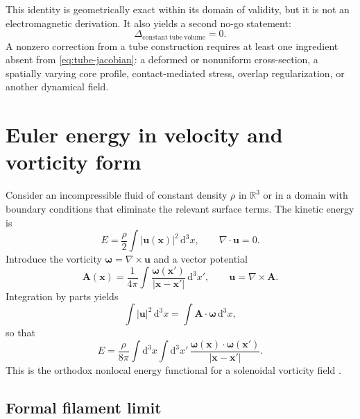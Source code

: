\documentclass[aps,pre,preprint,notitlepage,nofootinbib,superscriptaddress]{revtex4-2}
\newcommand{\dd}{\mathrm d}
\newcommand{\RR}{\mathbb R}
\begin{document}
This identity is geometrically exact within its domain of validity, but it is not an electromagnetic derivation.  It also yields a second no-go statement:
\begin{equation}
  \boxed{\Delta_{\mathrm{constant\ tube\ volume}}=0.}
  \label{eq:tube-no-go}
\end{equation}
A nonzero correction from a tube construction requires at least one ingredient absent from \cref{eq:tube-jacobian}: a deformed or nonuniform cross-section, a spatially varying core profile, contact-mediated stress, overlap regularization, or another dynamical field.

\section{Euler energy in velocity and vorticity form}
\label{sec:euler-energy}

Consider an incompressible fluid of constant density $\rho$ in $\RR^3$ or in a domain with boundary conditions that eliminate the relevant surface terms.  The kinetic energy is
\begin{equation}
  E=\frac{\rho}{2}\int |\bm u(\bm x)|^2\,\dd^3x,
  \qquad \nabla\cdot\bm u=0.
  \label{eq:euler-velocity-energy}
\end{equation}
Introduce the vorticity $\bm\omega=\nabla\times\bm u$ and a vector potential
\begin{equation}
  \bm A(\bm x)=\frac{1}{4\pi}
  \int\frac{\bm\omega(\bm x')}{|\bm x-\bm x'|}\,\dd^3x',
  \qquad \bm u=\nabla\times\bm A.
\end{equation}
Integration by parts yields
\begin{equation}
  \int |\bm u|^2\,\dd^3x
  =\int \bm A\cdot\bm\omega\,\dd^3x,
\end{equation}
so that
\begin{equation}
  \boxed{
  E=\frac{\rho}{8\pi}
  \int\!\dd^3x\int\!\dd^3x'\,
  \frac{\bm\omega(\bm x)\cdot\bm\omega(\bm x')}
       {|\bm x-\bm x'|}.}
  \label{eq:vorticity-energy}
\end{equation}
This is the orthodox nonlocal energy functional for a solenoidal vorticity field \cite{Saffman1992,Moffatt1969}.

\subsection{Formal filament limit}
\end{document}
